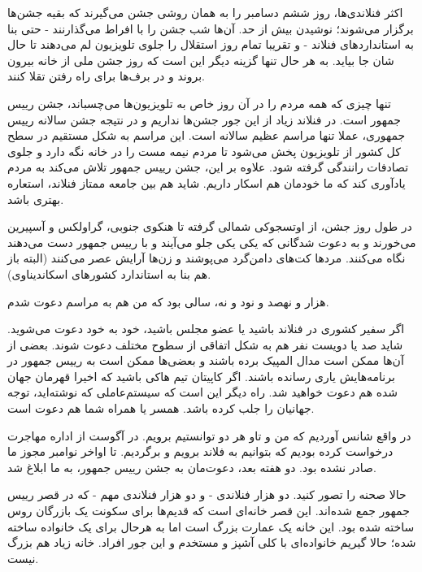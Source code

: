 اکثر فنلاندی‌ها، روز ششم دسامبر را به همان روشی جشن می‌گیرند که بقیه
جشن‌ها برگزار می‌شوند؛ نوشیدن بیش از حد.  آن‌ها شب جشن را با افراط
می‌گذارنند - حتی بنا به استانداردهای فنلاند - و تقریبا تمام روز استقلال
را جلوی تلویزیون لم می‌دهند تا حال شان جا بیاید. به هر حال تنها گزینه
دیگر این است که روز جشن ملی از خانه بیرون بروند و در برف‌ها برای راه
رفتن تقلا کنند.

تنها چیزی که همه مردم را در آن روز خاص به تلویزیون‌ها می‌چسباند، جشن
رییس جمهور است. در فنلاند زیاد از این جور جشن‌ها نداریم و در نتیجه جشن
سالانه رییس جمهوری،‌ عملا تنها مراسم عظیم سالانه است. این مراسم به شکل
مستقیم در سطح کل کشور از تلویزیون پخش می‌شود تا مردم نیمه مست را در
خانه نگه دارد و جلوی تصادفات رانندگی گرفته شود. علاوه بر این، جشن رییس
جمهور تلاش می‌کند به مردم یادآوری کند که ما خودمان هم اسکار داریم. شاید
هم  بین جامعه ممتاز فنلاند، استعاره بهتری
باشد.

در طول روز جشن، از اوتسجوکی شمالی گرفته تا
هنکوی جنوبی، گراولکس و آسپیرین می‌خورند و به دعوت شدگانی که یکی یکی
جلو می‌آیند و با رییس جمهور دست می‌دهند نگاه می‌کنند. مردها کت‌های دامن‌گرد
می‌پوشند و زن‌ها آرایش عصر می‌کنند (البته باز هم بنا به استاندارد کشورهای
اسکاندیناوی).

هزار و نهصد و نود و نه، سالی بود که من هم به مراسم دعوت شدم. 

اگر سفیر کشوری در فنلاند باشید یا عضو مجلس باشید، خود به خود دعوت
می‌شوید. شاید صد یا دویست نفر هم به شکل اتفاقی از سطوح مختلف دعوت
شوند. بعضی از آن‌ها ممکن است مدال المپیک برده باشند و بعضی‌ها ممکن است
به رییس جمهور در برنامه‌هایش یاری رسانده باشند. اگر کاپیتان تیم هاکی
باشید که اخیرا قهرمان جهان شده هم دعوت خواهید شد. راه دیگر این است که
سیستم‌عاملی که نوشته‌اید، توجه جهانیان را جلب کرده باشد. همسر یا همراه
شما هم دعوت است.

در واقع شانس آوردیم که من و تاو هر دو توانستیم برویم. در آگوست از
اداره مهاجرت درخواست کرده بودیم که بتوانیم به فلاند برویم و
برگردیم. تا اواخر نوامبر مجوز ما صادر نشده بود. دو هفته بعد، دعوت‌مان
به جشن رییس جمهور، به ما ابلاغ شد.

حالا صحنه را تصور کنید. دو هزار فنلاندی - و دو هزار فنلاندی مهم - که
در قصر رییس جمهور جمع شده‌اند. این قصر خانه‌ای است که قدیم‌ها برای سکونت
یک بازرگان روس ساخته شده بود. این خانه یک عمارت بزرگ است اما به هرحال
برای یک خانواده ساخته شده؛ حالا گیریم خانواده‌ای با کلی آشپز و مستخدم و
این جور افراد. خانه زیاد هم بزرگ نیست.

